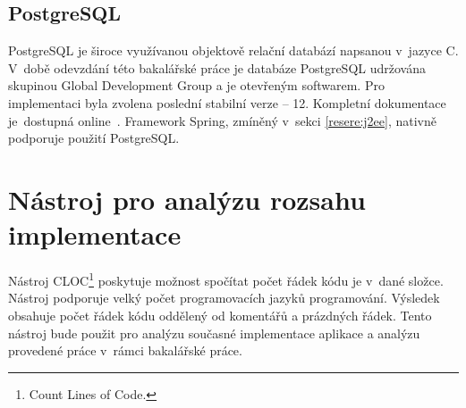     \subsection{PostgreSQL}
        PostgreSQL je široce využívanou objektově relační databází napsanou v~jazyce C. V~době odevzdání této bakalářské práce je databáze PostgreSQL udržována skupinou Global Development Group a je otevřeným softwarem. Pro implementaci byla zvolena poslední stabilní verze -- 12. Kompletní dokumentace je~dostupná online~\cite{postgres-documentation}. Framework Spring, zmíněný v~sekci \ref{resere:j2ee}, nativně podporuje použití PostgreSQL.
        

\section{Nástroj pro analýzu rozsahu implementace}\label{reserse:cloc}
    Nástroj CLOC\footnote{Count Lines of Code.}\cite{cloc-download} poskytuje možnost spočítat počet řádek kódu je v~dané složce. Nástroj podporuje velký počet programovacích jazyků programování. Výsledek obsahuje počet řádek kódu oddělený od komentářů a prázdných řádek. Tento nástroj bude použit pro analýzu současné implementace aplikace a analýzu provedené práce v~rámci bakalářské práce.